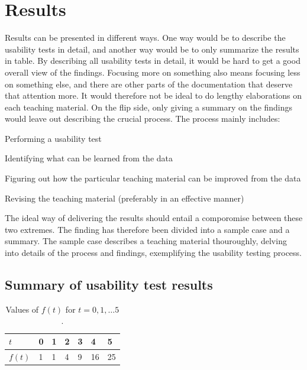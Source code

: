 \chapter{Results}
Results can be presented in different ways. One way would be to describe the usability tests in detail, and another way would be to only summarize the results in table. 
By describing all usability tests in detail, it would be hard to get a good overall view of the findings. Focusing more on something also means focusing less on something 
else, and there are other parts of the documentation that deserve that attention more. It would therefore not be ideal to do lengthy elaborations on each teaching material.
On the flip side, only giving a summary on the findings would leave out describing the crucial process. The process mainly includes:
\begin{enumarate}
	\item Performing a usability test
	\item Identifying what can be learned from the data
	\item Figuring out how the particular teaching material can be improved from the data
	\item Revising the teaching material (preferably in an effective manner)
\end{enumarate}
The ideal way of delivering the results should entail a comporomise between these two extremes. The finding has therefore been divided into a sample case and a summary.
The sample case describes a teaching material thouroughly, delving into details of the process and findings, exemplifying the usability testing process. 


%

\section{Summary of usability test results}


\begin{table}[H]
\centering
\caption{Values of $f(t)$ for $t=0,1,\dots 5$.}
\begin{tabular}{l|llllll} \hline\hline
$t$ & 0 & 1 & 2 & 3 & 4 & 5 \\ \hline
$f(t)$ & 1 & 1 & 4 & 9 & 16 & 25 \\ \hline\hline
\end{tabular}
\end{table}

